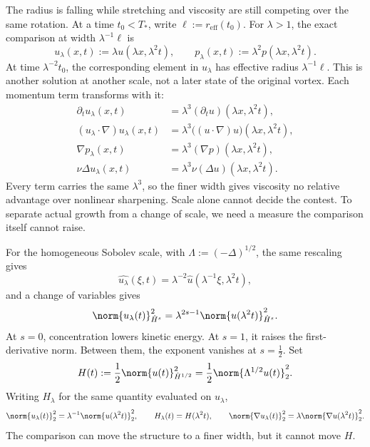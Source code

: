 
The radius is falling while stretching and viscosity are still competing over the same rotation.
At a time \(t_0<T_*\), write \(\ell:=r_{\mathrm{eff}}(t_0)\).
For \(\lambda>1\), the exact \NavierStokes{} comparison at width \(\lambda^{-1}\ell\) is
\[
  u_\lambda(x,t)
  :=
  \lambda u(\lambda x,\lambda^2t),
  \qquad
  p_\lambda(x,t)
  :=
  \lambda^2p(\lambda x,\lambda^2t).
\]
At time \(\lambda^{-2}t_0\), the corresponding element in \(u_\lambda\) has effective radius \(\lambda^{-1}\ell\).
This is another solution at another scale, not a later state of the original vortex.
Each momentum term transforms with it:
\[
\begin{aligned}
  \partial_tu_\lambda(x,t)
  &=
  \lambda^3(\partial_tu)(\lambda x,\lambda^2t),
  \\
  (u_\lambda\cdot\nabla)u_\lambda(x,t)
  &=
  \lambda^3\bigl((u\cdot\nabla)u\bigr)(\lambda x,\lambda^2t),
  \\
  \nabla p_\lambda(x,t)
  &=
  \lambda^3(\nabla p)(\lambda x,\lambda^2t),
  \\
  \nu\Delta u_\lambda(x,t)
  &=
  \lambda^3\nu(\Delta u)(\lambda x,\lambda^2t).
\end{aligned}
\]
Every term carries the same \(\lambda^3\), so the finer width gives viscosity no relative advantage over nonlinear sharpening.
Scale alone cannot decide the contest.
To separate actual growth from a change of scale, we need a measure the comparison itself cannot raise.


For the homogeneous Sobolev scale, with \(\Lambda:=(-\Delta)^{1/2}\), the same rescaling gives
\[
  \widehat{u_\lambda}(\xi,t)
  =
  \lambda^{-2}\widehat u(\lambda^{-1}\xi,\lambda^2t),
\]
and a change of variables gives
\[
  \norm{u_\lambda(t)}_{\dot H^s}^2
  =
  \lambda^{2s-1}
  \norm{u(\lambda^2t)}_{\dot H^s}^2.
\]
At \(s=0\), concentration lowers kinetic energy.
At \(s=1\), it raises the first-derivative norm.
Between them, the exponent vanishes at \(s=\tfrac12\).
Set
\[
  H(t)
  :=
  \frac12\norm{u(t)}_{\dot H^{1/2}}^2
  =
  \frac12\norm{\Lambda^{1/2}u(t)}_2^2.
\]
Writing \(H_\lambda\) for the same quantity evaluated on \(u_\lambda\),
\[
  \norm{u_\lambda(t)}_2^2
  =
  \lambda^{-1}\norm{u(\lambda^2t)}_2^2,
  \qquad
  H_\lambda(t)=H(\lambda^2t),
  \qquad
  \norm{\nabla u_\lambda(t)}_2^2
  =
  \lambda\norm{\nabla u(\lambda^2t)}_2^2.
\]
The comparison can move the structure to a finer width, but it cannot move \(H\).

